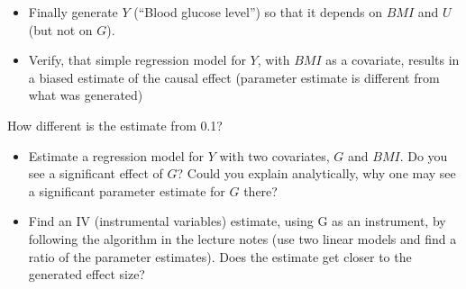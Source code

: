 \documentclass[
]{book}
\newenvironment{Shaded}{\begin{snugshade}}{\end{snugshade}}
\newcommand{\AttributeTok}[1]{\textcolor[rgb]{0.13,0.29,0.53}{#1}}
\newcommand{\CommentTok}[1]{\textcolor[rgb]{0.56,0.35,0.01}{\textit{#1}}}
\newcommand{\DecValTok}[1]{\textcolor[rgb]{0.00,0.00,0.81}{#1}}
\newcommand{\FloatTok}[1]{\textcolor[rgb]{0.00,0.00,0.81}{#1}}
\newcommand{\FunctionTok}[1]{\textcolor[rgb]{0.13,0.29,0.53}{\textbf{#1}}}
\newcommand{\NormalTok}[1]{#1}
\newcommand{\OtherTok}[1]{\textcolor[rgb]{0.56,0.35,0.01}{#1}}
\newcommand{\SpecialCharTok}[1]{\textcolor[rgb]{0.81,0.36,0.00}{\textbf{#1}}}
\providecommand{\tightlist}{%
  \setlength{\itemsep}{0pt}\setlength{\parskip}{0pt}}
\begin{document}
\begin{itemize}
\tightlist
\item
  Finally generate \(Y\) (``Blood glucose level'') so that it depends on \(BMI\) and \(U\) (but not on \(G\)).
\end{itemize}

\begin{Shaded}
\end{Shaded}

\begin{itemize}
\tightlist
\item
  Verify, that simple regression model for \(Y\), with \(BMI\) as a covariate, results in a biased estimate of the causal effect (parameter estimate is different from what was generated)
\end{itemize}

How different is the estimate from 0.1?

\begin{itemize}
\item
  Estimate a regression model for \(Y\) with two covariates, \(G\) and \(BMI\). Do you see a significant effect of \(G\)? Could you explain analytically, why one may see a significant parameter estimate for \(G\) there?
\item
  Find an IV (instrumental variables) estimate, using G as an instrument, by following the algorithm in the lecture notes (use two linear models and find a ratio of the parameter estimates). Does the estimate get closer to the generated effect size?
\end{itemize}

\begin{Shaded}
\end{Shaded}
\end{document}
